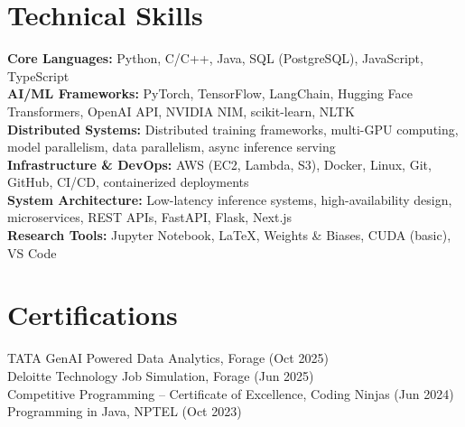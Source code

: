 \documentclass[letterpaper,11pt]{article}
\begin{document}
\section{Technical Skills}
\begin{itemize}[leftmargin=0.15in, label={}]
    \small{\item{
     \textbf{Core Languages:} Python, C/C++, Java, SQL (PostgreSQL), JavaScript, TypeScript \\[3pt]
     \textbf{AI/ML Frameworks:} PyTorch, TensorFlow, LangChain, Hugging Face Transformers, OpenAI API, NVIDIA NIM, scikit-learn, NLTK \\[3pt]
     \textbf{Distributed Systems:} Distributed training frameworks, multi-GPU computing, model parallelism, data parallelism, async inference serving \\[3pt]
     \textbf{Infrastructure \& DevOps:} AWS (EC2, Lambda, S3), Docker, Linux, Git, GitHub, CI/CD, containerized deployments \\[3pt]
     \textbf{System Architecture:} Low-latency inference systems, high-availability design, microservices, REST APIs, FastAPI, Flask, Next.js \\[3pt]
     \textbf{Research Tools:} Jupyter Notebook, LaTeX, Weights \& Biases, CUDA (basic), VS Code
    }}
\end{itemize}

\section{Certifications}
\begin{itemize}[leftmargin=0.15in, label={}]
    \small{\item{
     TATA GenAI Powered Data Analytics, Forage (Oct 2025) \\
     Deloitte Technology Job Simulation, Forage (Jun 2025) \\
     Competitive Programming -- Certificate of Excellence, Coding Ninjas (Jun 2024) \\
     Programming in Java, NPTEL (Oct 2023)
    }}
\end{itemize}
\end{document}
